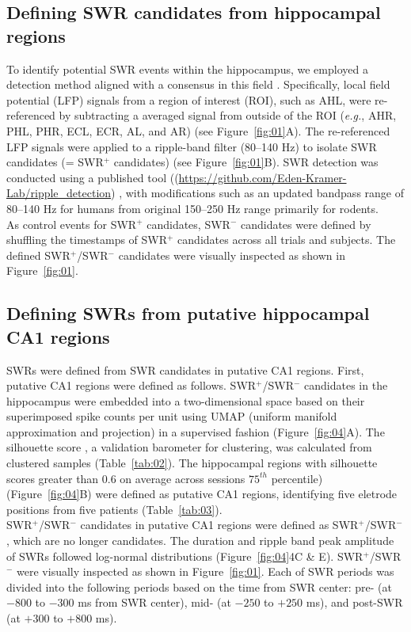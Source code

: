 \subsection{Defining SWR candidates from hippocampal regions}
To identify potential SWR events within the hippocampus, we employed a detection method aligned with a consensus in this field \cite{liu_consensus_2022}. Specifically, local field potential (LFP) signals from a region of interest (ROI), such as AHL, were re-referenced by subtracting a averaged signal from outside of the ROI (\textit{e.g.}, AHR, PHL, PHR, ECL, ECR, AL, and AR) (see Figure~\ref{fig:01}A). The re-referenced LFP signals were applied to a ripple-band filter (80--140 Hz) to isolate SWR candidates (= SWR$^+$ candidates) (see Figure~\ref{fig:01}B). SWR detection was conducted using a published tool ((\url{https://github.com/Eden-Kramer-Lab/ripple_detection}) \cite{kay_hippocampal_2016}, with modifications such as an updated bandpass range of 80--140 Hz for humans \cite{norman_hippocampal_2019} \cite{norman_hippocampal_2021} from original 150--250 Hz range primarily for rodents.
\\
\indent
As control events for SWR$^+$ candidates, SWR$^-$ candidates were defined by shuffling the timestamps of SWR$^+$ candidates across all trials and subjects. The defined SWR$^+$/SWR$^-$ candidates were visually inspected as shown in Figure~\ref{fig:01}.

\subsection{Defining SWRs from putative hippocampal CA1 regions}
SWRs were defined from SWR candidates in putative CA1 regions. First, putative CA1 regions were defined as follows. SWR$^+$/SWR$^-$ candidates in the hippocampus were embedded into a two-dimensional space based on their superimposed spike counts per unit using UMAP (uniform manifold approximation and projection) \cite{mcinnes_umap_2018} in a supervised fashion (Figure~\ref{fig:04}A). The silhouette score \cite{rousseeuw_silhouettes_1987}, a validation barometer for clustering, was calculated from clustered samples (Table~\ref{tab:02}). The hippocampal regions with silhouette scores greater than 0.6 on average across sessions $75^{th}$ percentile) (Figure~\ref{fig:04}B) were defined as putative CA1 regions, identifying five eletrode positions from five patients (Table~\ref{tab:03}).
\\
\indent
SWR$^+$/SWR$^-$ candidates in putative CA1 regions were defined as SWR$^+$/SWR$^-$, which are no longer candidates. The duration and ripple band peak amplitude of SWRs followed log-normal distributions (Figure~\ref{fig:04}4C \& E). SWR$^+$/SWR$^-$ were visually inspected as shown in Figure~\ref{fig:01}. Each of SWR periods was divided into the following periods based on the time from SWR center: pre- (at $-800$ to $-300$ ms from SWR center), mid- (at $-250$ to $+250$ ms), and post-SWR (at $+300$ to $+800$ ms).

